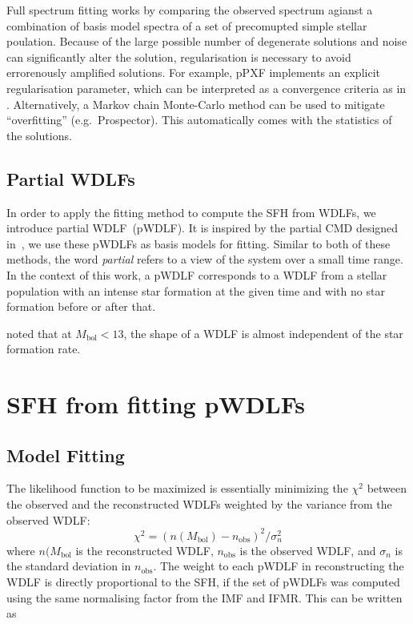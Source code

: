 \documentclass[fleqn,usenatbib]{mnras}
\begin{document}
Full spectrum fitting works by comparing the observed spectrum agianst a
combination of basis model spectra of a set of precomupted simple stellar
poulation. Because of the large possible number of degenerate solutions and
noise can significantly alter the solution, regularisation is necessary
to avoid errorenously amplified solutions. For example, pPXF implements
an explicit regularisation parameter, which can be interpreted as a
convergence criteria as in \citet{2013MNRAS.434.1549R}. Alternatively, a
Markov chain Monte-Carlo method can be used to mitigate ``overfitting''
(e.g.\ Prospector).
This automatically comes with the statistics of the solutions.

\subsection{Partial WDLFs}
In order to apply the fitting method to compute the SFH from WDLFs, we
introduce partial WDLF~(pWDLF). It is inspired by the partial CMD designed
in~\citep{2006A&A...459..783C}, we use these pWDLFs as basis models
for fitting. Similar to both of these methods, the word \textit{partial} 
refers to a view of the system over a small time range. In the context of
this work, a pWDLF corresponds to a WDLF from a stellar population with
an intense star formation at the given time and with no star formation 
before or after that.

\citet{2008ApJ...682L.109I} noted that at $M_{\mathrm{bol}} < 13$, the
shape of a WDLF is almost independent of the star formation rate.


\section{SFH from fitting pWDLFs}

\subsection{Model Fitting}
The likelihood function to be maximized is essentially minimizing the
$\chi^2$ between the observed and the reconstructed WDLFs weighted by the
variance from the observed WDLF:
\begin{equation}
\chi^2 = \left(n(M_\mathrm{bol}) - n_\mathrm{obs}\right)^2 / \sigma_n^2
\end{equation}
where $n(M_\mathrm{bol}$ is the reconstructed WDLF, $n_\mathrm{obs}$
is the observed WDLF, and $\sigma_n$ is the standard deviation in
$n_\mathrm{obs}$.  The weight to each pWDLF in reconstructing the WDLF
is directly proportional to the SFH, if the set of pWDLFs was computed
using the same normalising factor from the IMF and IFMR. This can be
written as
\end{document}
